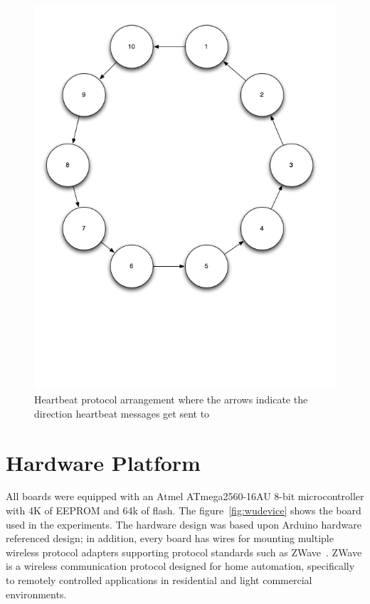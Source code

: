 \begin{figure}[h!]
\centering
    \includegraphics[width=\linewidth]{figures/heartbeat-protocol-arrangement}
\caption{Heartbeat protocol arrangement where the arrows indicate the direction
  heartbeat messages get sent to}
\label{fig:heartbeat-protocol-arrangement}
\end{figure}

\section{Hardware Platform}

All boards were equipped with an Atmel ATmega2560-16AU 8-bit microcontroller
with 4K of EEPROM and 64k of flash. The figure~\ref{fig:wudevice} shows the
board used in the experiments. The hardware design was based upon Arduino
hardware referenced design; in addition, every board has wires for mounting
multiple wireless protocol adapters supporting protocol standards such as
ZWave~\cite{ZWave}. ZWave is a wireless communication protocol designed for home
automation, specifically to remotely controlled applications in residential and
light commercial environments.

